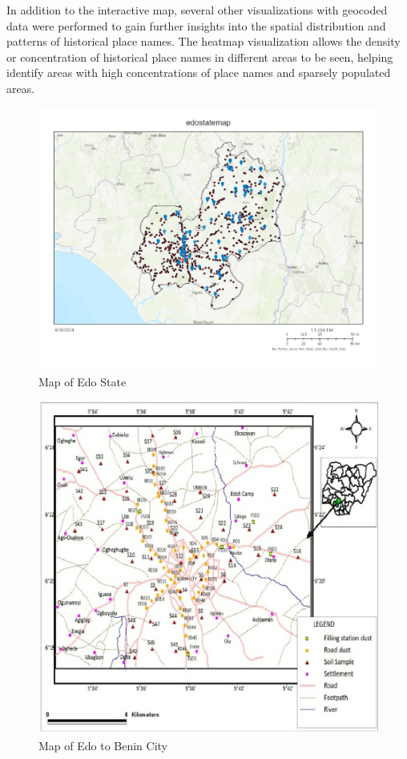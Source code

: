 In addition to the interactive map, several other visualizations with geocoded data were performed to gain further insights into the spatial distribution and patterns of historical place names. The heatmap visualization allows the density or concentration of historical place names in different areas to be seen, helping identify areas with high concentrations of place names and sparsely populated areas.

\begin{figure}[htb]
    \centering
    \includegraphics[width=1\linewidth]{edostate_updated.jpg}
    \caption{Map of Edo State}
    \label{fig:edostatemap}
\end{figure}
\vspace{1cm}
\begin{figure}[htb]
    \centering
    \includegraphics[width=.8\linewidth]{edobenin.png}
    \caption{Map of Edo to Benin City}
    \label{fig:edobeninstatemap}
\end{figure}

